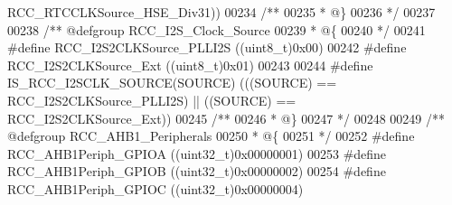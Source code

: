\begin{DoxyCode}
      RCC_RTCCLKSource_HSE_Div31\textcolor{preprocessor}{)}\textcolor{preprocessor}{)}
00234 \textcolor{comment}{/**}
00235 \textcolor{comment}{  * @\}}
00236 \textcolor{comment}{  */}
00237 
00238 \textcolor{comment}{/** @defgroup RCC\_I2S\_Clock\_Source}
00239 \textcolor{comment}{  * @\{}
00240 \textcolor{comment}{  */}
00241 \textcolor{preprocessor}{#}\textcolor{preprocessor}{define} \textcolor{preprocessor}{RCC\_I2S2CLKSource\_PLLI2S}             \textcolor{preprocessor}{(}\textcolor{preprocessor}{(}\textcolor{preprocessor}{uint8\_t}\textcolor{preprocessor}{)}0x00\textcolor{preprocessor}{)}
00242 \textcolor{preprocessor}{#}\textcolor{preprocessor}{define} \textcolor{preprocessor}{RCC\_I2S2CLKSource\_Ext}                \textcolor{preprocessor}{(}\textcolor{preprocessor}{(}\textcolor{preprocessor}{uint8\_t}\textcolor{preprocessor}{)}0x01\textcolor{preprocessor}{)}
00243 
00244 \textcolor{preprocessor}{#}\textcolor{preprocessor}{define} \textcolor{preprocessor}{IS\_RCC\_I2SCLK\_SOURCE}\textcolor{preprocessor}{(}\textcolor{preprocessor}{SOURCE}\textcolor{preprocessor}{)} \textcolor{preprocessor}{(}\textcolor{preprocessor}{(}\textcolor{preprocessor}{(}\textcolor{preprocessor}{SOURCE}\textcolor{preprocessor}{)} \textcolor{preprocessor}{==} RCC_I2S2CLKSource_PLLI2S\textcolor{preprocessor}{)} \textcolor{preprocessor}{||} \textcolor{preprocessor}{(}\textcolor{preprocessor}{(}\textcolor{preprocessor}{SOURCE}\textcolor{preprocessor}{)} \textcolor{preprocessor}{==} 
      RCC_I2S2CLKSource_Ext\textcolor{preprocessor}{)}\textcolor{preprocessor}{)}
00245 \textcolor{comment}{/**}
00246 \textcolor{comment}{  * @\}}
00247 \textcolor{comment}{  */}
00248 
00249 \textcolor{comment}{/** @defgroup RCC\_AHB1\_Peripherals }
00250 \textcolor{comment}{  * @\{}
00251 \textcolor{comment}{  */}
00252 \textcolor{preprocessor}{#}\textcolor{preprocessor}{define} \textcolor{preprocessor}{RCC\_AHB1Periph\_GPIOA}             \textcolor{preprocessor}{(}\textcolor{preprocessor}{(}\textcolor{preprocessor}{uint32\_t}\textcolor{preprocessor}{)}0x00000001\textcolor{preprocessor}{)}
00253 \textcolor{preprocessor}{#}\textcolor{preprocessor}{define} \textcolor{preprocessor}{RCC\_AHB1Periph\_GPIOB}             \textcolor{preprocessor}{(}\textcolor{preprocessor}{(}\textcolor{preprocessor}{uint32\_t}\textcolor{preprocessor}{)}0x00000002\textcolor{preprocessor}{)}
00254 \textcolor{preprocessor}{#}\textcolor{preprocessor}{define} \textcolor{preprocessor}{RCC\_AHB1Periph\_GPIOC}             \textcolor{preprocessor}{(}\textcolor{preprocessor}{(}\textcolor{preprocessor}{uint32\_t}\textcolor{preprocessor}{)}0x00000004\textcolor{preprocessor}{)}

\end{DoxyCode}
